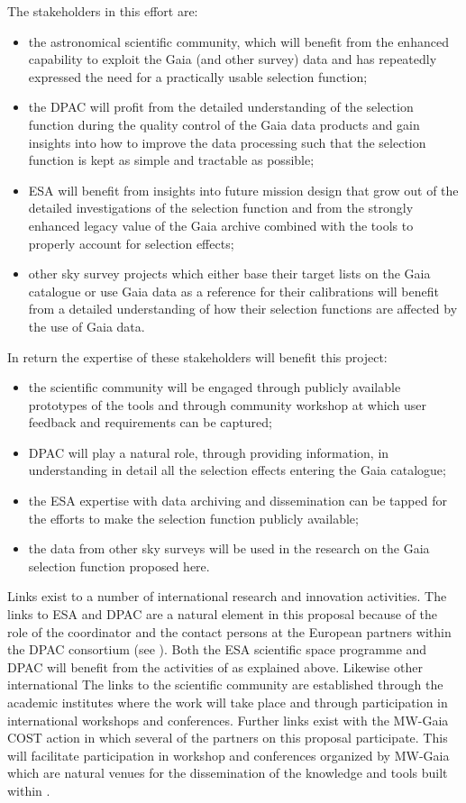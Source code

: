 The stakeholders in this effort are:
\begin{itemize}
    \item the astronomical scientific community, which will benefit from the enhanced capability to exploit the Gaia (and other survey) data and has repeatedly expressed the need for a practically usable selection function;
    \item the DPAC will profit from the detailed understanding of the selection function during the quality control of the Gaia data products and gain insights into how to improve the data processing such that the selection function is kept as simple and tractable as possible;
    \item ESA will benefit from insights into future mission design that grow out of the detailed investigations of the selection function and from the strongly enhanced legacy value of the Gaia archive combined with the tools to properly account for selection effects;
    \item other sky survey projects which either base their target lists on the Gaia catalogue or use Gaia data as a reference for their calibrations will benefit from a detailed understanding of how their selection functions are affected by the use of Gaia data.
\end{itemize}
In return the expertise of these stakeholders will benefit this project:
\begin{itemize}
    \item the scientific community will be engaged through publicly available prototypes of the {\acro} tools and through community workshop at which user feedback and requirements can be captured;
    \item DPAC will play a natural role, through providing information, in understanding in detail all the selection effects entering the Gaia catalogue;
    \item the ESA expertise with data archiving and dissemination can be tapped for the efforts to make the selection function publicly available; 
    \item the data from other sky surveys will be used in the research on the Gaia selection function proposed here.
\end{itemize}
  
Links exist to a number of international research and innovation activities. The links to ESA and DPAC are a natural element in this proposal because of the role of the coordinator and the contact persons at the European partners within the DPAC consortium (see ). Both the ESA scientific space programme and DPAC will benefit from the activities of {\acro} as explained above. Likewise other international  The links to the scientific community are established through the academic institutes where the work will take place and through participation in international workshops and conferences. Further links exist with the MW-Gaia COST action in which several of the partners on this proposal participate. This will facilitate participation in workshop and conferences organized by MW-Gaia which are natural venues for the dissemination of the knowledge and tools built within {\acro}.

